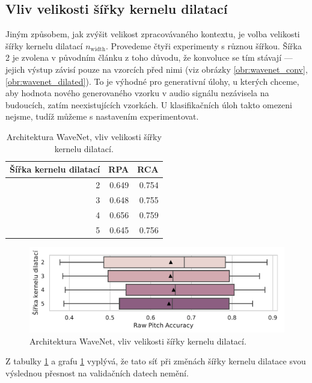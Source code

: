 \subsection{Vliv velikosti šířky kernelu dilatací}

Jiným způsobem, jak zvýšit velikost zpracovávaného kontextu, je volba velikosti šířky kernelu dilatací $n_{\mathrm{width}}$. Provedeme čtyři experimenty s různou šířkou. Šířka 2 je zvolena v původním článku z toho důvodu, že konvoluce se tím stávají  --- jejich výstup závisí pouze na vzorcích před nimi (viz obrázky \ref{obr:wavenet_conv}, \ref{obr:wavenet_dilated}). To je výhodné pro generativní úlohy, u kterých chceme, aby hodnota nového generovaného vzorku v audio signálu nezávisela na budoucích, zatím neexistujících vzorkách. U klasifikačních úloh takto omezeni nejsme, tudíž můžeme s nastavením experimentovat. 

\begin{table}[h!]
\centering
    \begin{tabular}{rrr}
    \toprule
    Šířka kernelu dilatací &   RPA &   RCA \\
    \midrule
                        2 & 0.649 & 0.754 \\
                        3 & 0.648 & 0.755 \\
                        4 & 0.656 & 0.759 \\
                        5 & 0.645 & 0.756 \\
    \bottomrule
    \end{tabular}
\caption{Architektura WaveNet, vliv velikosti šířky kernelu dilatací.}\label{tab:wavenet_dilation_width}
\end{table}

\begin{figure}[h]\centering
    \includegraphics[scale=0.6]{../img/figures/wavenet_dilation_width.pdf}
\caption{Architektura WaveNet, vliv velikosti šířky kernelu dilatací.}\label{obr:wavenet_dilation_width}
\end{figure}

Z tabulky \ref{tab:wavenet_dilation_width} a grafu \ref{obr:wavenet_dilation_width} vyplývá, že tato síť při změnách šířky kernelu dilatace svou výslednou přesnost na validačních datech nemění.

